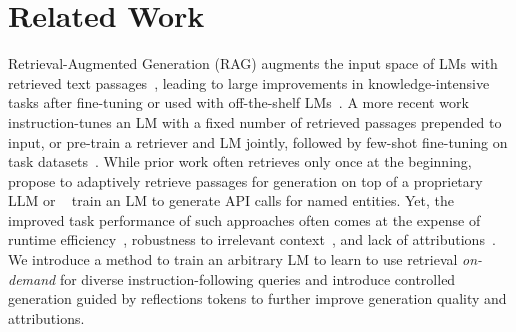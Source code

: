 \documentclass{article} %
\begin{document}



\section{Related Work}

{
Retrieval-Augmented Generation (RAG) augments the input space of LMs with retrieved text passages~\citep{guu2020retrieval,lewis2020retrieval}, leading to large improvements in knowledge-intensive tasks after fine-tuning or used with off-the-shelf LMs~\citep{ram2023context}. 
A more recent work~\citep{luo2023sail} instruction-tunes an LM with a fixed number of retrieved passages prepended to input, or pre-train a retriever and LM jointly, followed by few-shot fine-tuning on task datasets~\citep{izacard2022few}. }
While prior work often retrieves only once at the beginning, \cite{jiang2023active} propose to
adaptively retrieve passages for generation on top of a proprietary LLM or ~\cite{schick2023toolformer} train an LM to generate API calls for named entities. 
Yet, the improved task performance of such approaches often comes at the expense of runtime efficiency~\citep{mallen2022not}, robustness to irrelevant context~\citep{pmlr-v202-shi23a}, and lack of attributions~\citep{liu2023evaluating,gao2023enabling}. 
We introduce a method to train an arbitrary LM to learn to use retrieval \textit{on-demand} for diverse instruction-following queries and introduce controlled generation guided by reflections tokens to further improve generation quality and attributions. 
\end{document}
